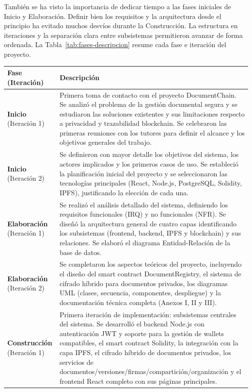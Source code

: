 \documentclass[11pt, a4paper]{article}
\begin{document}
También se ha visto la importancia de dedicar tiempo a las fases iniciales de Inicio y Elaboración. Definir bien los requisitos y la arquitectura desde el principio ha evitado muchos desvíos durante la Construcción. La estructura en iteraciones y la separación clara entre subsistemas permitieron avanzar de forma ordenada. La Tabla~\ref{tab:fases-descripcion} resume cada fase e iteración del proyecto.
\begin{table}[H]
\centering
\begin{tabular}{|p{4cm}|p{10cm}|}
\hline
\textbf{Fase (Iteración)} & \textbf{Descripción} \\
\hline
\textbf{Inicio} (Iteración 1) &
Primera toma de contacto con el proyecto DocumentChain. Se analizó el problema de la gestión documental segura y se estudiaron las soluciones existentes y sus limitaciones respecto a privacidad y trazabilidad blockchain. Se celebraron las primeras reuniones con los tutores para definir el alcance y los objetivos generales del trabajo. \\
\hline
\textbf{Inicio} (Iteración 2) &
Se definieron con mayor detalle los objetivos del sistema, los actores implicados y los primeros casos de uso. Se estableció la planificación inicial del proyecto y se seleccionaron las tecnologías principales (React, Node.js, PostgreSQL, Solidity, IPFS), justificando la elección de cada una. \\
\hline
\textbf{Elaboración} (Iteración 1) &
Se realizó el análisis detallado del sistema, definiendo los requisitos funcionales (IRQ) y no funcionales (NFR). Se diseñó la arquitectura general de cuatro capas identificando los subsistemas (frontend, backend, IPFS y blockchain) y sus relaciones. Se elaboró el diagrama Entidad-Relación de la base de datos. \\
\hline
\textbf{Elaboración} (Iteración 2) &
Se completaron los aspectos teóricos del proyecto, incluyendo el diseño del smart contract DocumentRegistry, el sistema de cifrado híbrido para documentos privados, los diagramas UML (clases, secuencia, componentes, despliegue) y la documentación técnica completa (Anexos I, II y III). \\
\hline
\textbf{Construcción} (Iteración 1) &
Primera iteración de implementación: subsistemas centrales del sistema. Se desarrolló el backend Node.js con autenticación JWT y soporte para la gestión de wallets compatibles, el smart contract Solidity, la integración con la capa IPFS, el cifrado híbrido de documentos privados, los servicios de documentos/versiones/firmas/compartición/organización y el frontend React completo con sus páginas principales. \\

\end{tabular}
\end{table}
\end{document}
